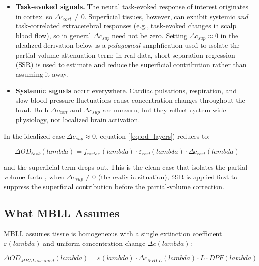 \documentclass[12pt]{article}
\def\lambda{lambda}%
\def\text#1{#1}%
\begin{document}
\begin{itemize}
\item \textbf{Task-evoked signals.} The neural task-evoked response of interest originates in cortex, so $\Delta c_{\text{cort}} \neq 0$. Superficial tissues, however, can exhibit systemic \emph{and} task-correlated extracerebral responses (e.g., task-evoked changes in scalp blood flow), so in general $\Delta c_{\text{sup}}$ need not be zero. Setting $\Delta c_{\text{sup}} \approx 0$ in the idealized derivation below is a \emph{pedagogical} simplification used to isolate the partial-volume attenuation term; in real data, short-separation regression (SSR) is used to estimate and reduce the superficial contribution rather than assuming it away.

\item \textbf{Systemic signals} occur everywhere. Cardiac pulsations, respiration, and slow blood pressure fluctuations cause concentration changes throughout the head. Both $\Delta c_{\text{cort}}$ and $\Delta c_{\text{sup}}$ are nonzero, but they reflect system-wide physiology, not localized brain activation.
\end{itemize}

In the idealized case $\Delta c_{\text{sup}} \approx 0$, equation (\ref{eq:od_layers}) reduces to:

\begin{equation}
\Delta\text{OD}_{\text{task}}(\lambda) = f_{\text{cortex}}(\lambda) \cdot \varepsilon_{\text{cort}}(\lambda) \cdot \Delta c_{\text{cort}}(\lambda)
\label{eq:od_task}
\end{equation}

and the superficial term drops out. This is the clean case that isolates the partial-volume factor; when $\Delta c_{\text{sup}} \neq 0$ (the realistic situation), SSR is applied first to suppress the superficial contribution before the partial-volume correction.

\subsection{What MBLL Assumes}

MBLL assumes tissue is homogeneous with a single extinction coefficient $\varepsilon(\lambda)$ and uniform concentration change $\Delta c(\lambda)$:

\begin{equation}
\Delta\text{OD}_{\text{MBLL assumed}}(\lambda) = \varepsilon(\lambda) \cdot \Delta c_{\text{MBLL}}(\lambda) \cdot L \cdot \text{DPF}(\lambda)
\end{equation}
\end{document}
